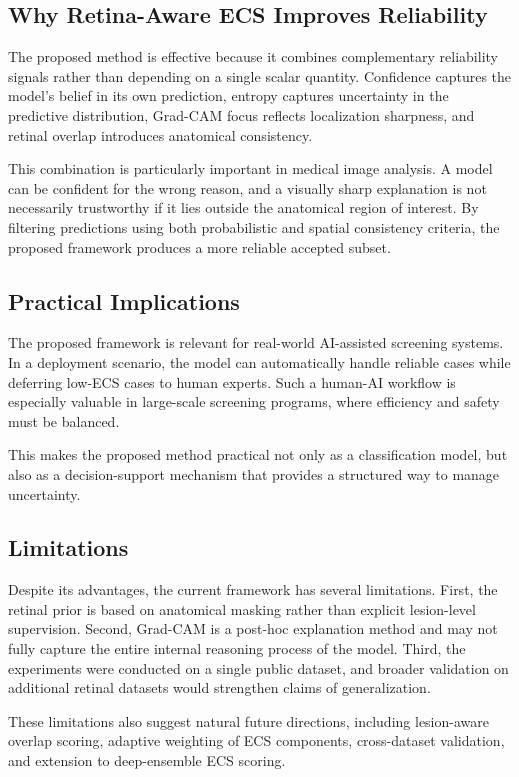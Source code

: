 \documentclass[conference]{IEEEtran}
\begin{document}
\subsection{Why Retina-Aware ECS Improves Reliability}
The proposed method is effective because it combines complementary reliability signals rather than depending on a single scalar quantity. Confidence captures the model’s belief in its own prediction, entropy captures uncertainty in the predictive distribution, Grad-CAM focus reflects localization sharpness, and retinal overlap introduces anatomical consistency.

This combination is particularly important in medical image analysis. A model can be confident for the wrong reason, and a visually sharp explanation is not necessarily trustworthy if it lies outside the anatomical region of interest. By filtering predictions using both probabilistic and spatial consistency criteria, the proposed framework produces a more reliable accepted subset.

\subsection{Practical Implications}
The proposed framework is relevant for real-world AI-assisted screening systems. In a deployment scenario, the model can automatically handle reliable cases while deferring low-ECS cases to human experts. Such a human-AI workflow is especially valuable in large-scale screening programs, where efficiency and safety must be balanced.

This makes the proposed method practical not only as a classification model, but also as a decision-support mechanism that provides a structured way to manage uncertainty.

\subsection{Limitations}
Despite its advantages, the current framework has several limitations. First, the retinal prior is based on anatomical masking rather than explicit lesion-level supervision. Second, Grad-CAM is a post-hoc explanation method and may not fully capture the entire internal reasoning process of the model. Third, the experiments were conducted on a single public dataset, and broader validation on additional retinal datasets would strengthen claims of generalization.

These limitations also suggest natural future directions, including lesion-aware overlap scoring, adaptive weighting of ECS components, cross-dataset validation, and extension to deep-ensemble ECS scoring.
\end{document}
